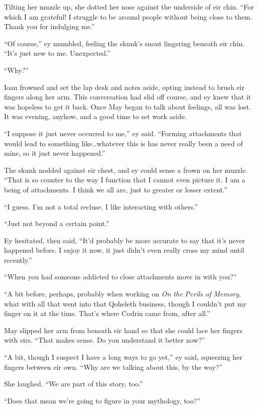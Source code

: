 Tilting her muzzle up, she dotted her nose against the underside of eir chin. ``For which I am grateful! I struggle to be around people without being close to them. Thank you for indulging me.''

``Of course,'' ey mumbled, feeling the skunk's snout lingering beneath eir chin. ``It's just new to me. Unexpected.''

``Why?''

Ioan frowned and set the lap desk and notes aside, opting instead to brush eir fingers along her arm. This conversation had slid off course, and ey knew that it was hopeless to get it back. Once May began to talk about feelings, all was lost. It was evening, anyhow, and a good time to set work aside.

``I suppose it just never occurred to me,'' ey said. ``Forming attachments that would lead to something like\ldots whatever this is has never really been a need of mine, so it just never happened.''

The skunk nodded against eir chest, and ey could sense a frown on her muzzle. ``That is so counter to the way I function that I cannot even picture it. I am a being of attachments. I think we all are, just to greater or lesser extent.''

``I guess. I'm not a total recluse. I like interacting with others.''

``Just not beyond a certain point.''

Ey hesitated, then said, ``It'd probably be more accurate to say that it's never happened before. I enjoy it now, it just didn't even really cross my mind until recently.''

``When you had someone addicted to close attachments move in with you?''

``A bit before, perhaps, probably when working on \emph{On the Perils of Memory}, what with all that went into that Qoheleth business, though I couldn't put my finger on it at the time. That's where Codrin came from, after all.''

May slipped her arm from beneath eir hand so that she could lace her fingers with eirs. ``That makes sense. Do you understand it better now?''

``A bit, though I suspect I have a long ways to go yet,'' ey said, squeezing her fingers between eir own. ``Why are we talking about this, by the way?''

She laughed. ``We are part of this story, too.''

``Does that mean we're going to figure in your mythology, too?''

